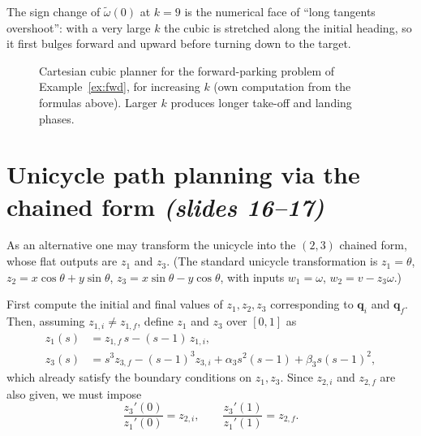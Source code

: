\documentclass[11pt,a4paper]{article}
\newcommand{\qi}{\boldsymbol{q}_i}
\newcommand{\qf}{\boldsymbol{q}_f}
\newcommand{\wt}{\tilde\omega}
\theoremstyle{definition}
\theoremstyle{plain}
\theoremstyle{remark}
\begin{document}
\begin{intuition}
The sign change of $\wt(0)$ at $k=9$ is the numerical face of ``long tangents overshoot'': with a very large $k$ the cubic is
stretched along the initial heading, so it first bulges forward and upward before turning down to the target.
\end{intuition}

\begin{figure}[h]
\centering
{}
\caption{Cartesian cubic planner for the forward-parking problem of Example~\ref{ex:fwd}, for increasing $k$
(own computation from the formulas above). Larger $k$ produces longer take-off and landing phases.}
\end{figure}

\section{Unicycle path planning via the chained form \emph{(slides 16--17)}}

As an alternative one may transform the unicycle into the $(2,3)$ chained form, whose flat outputs are $z_1$ and $z_3$.
(The standard unicycle transformation is $z_1=\theta$, $z_2=x\cos\theta+y\sin\theta$, $z_3=x\sin\theta-y\cos\theta$, with inputs
$w_1=\omega$, $w_2=v-z_3\omega$.)

First compute the initial and final values of $z_1,z_2,z_3$ corresponding to $\qi$ and $\qf$. Then, assuming
$z_{1,i}\ne z_{1,f}$, define $z_1$ and $z_3$ over $[0,1]$ as
\begin{align}
z_1(s)&=z_{1,f}\,s-(s-1)\,z_{1,i},\\
z_3(s)&=s^3z_{3,f}-(s-1)^3z_{3,i}+\alpha_3s^2(s-1)+\beta_3s(s-1)^2,
\end{align}
which already satisfy the boundary conditions on $z_1,z_3$. Since $z_{2,i}$ and $z_{2,f}$ are also given, we must impose
\begin{equation}
\frac{z_3'(0)}{z_1'(0)}=z_{2,i},\qquad \frac{z_3'(1)}{z_1'(1)}=z_{2,f}.
\end{equation}
\end{document}
